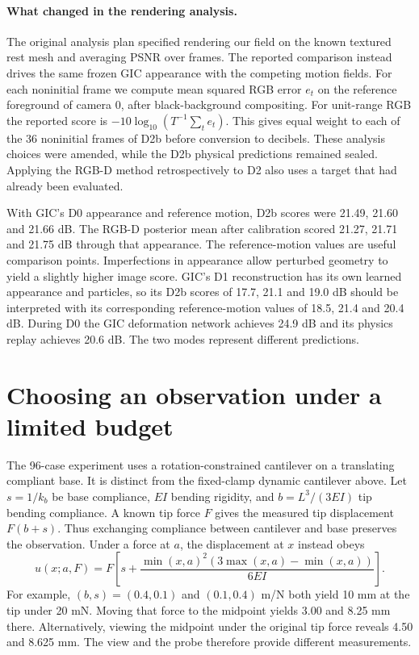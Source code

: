 \paragraph{What changed in the rendering analysis.}
The original analysis plan specified rendering our field on the known textured rest mesh and averaging PSNR over frames. The reported comparison instead drives the same frozen GIC appearance with the competing motion fields. For each noninitial frame we compute mean squared RGB error $e_t$ on the reference foreground of camera 0, after black-background compositing. For unit-range RGB the reported score is $-10\log_{10}(T^{-1}\sum_t e_t)$. This gives equal weight to each of the 36 noninitial frames of D2b before conversion to decibels. These analysis choices were amended, while the D2b physical predictions remained sealed. Applying the RGB-D method retrospectively to D2 also uses a target that had already been evaluated.

With GIC's D0 appearance and reference motion, D2b scores were 21.49, 21.60 and 21.66 dB. The RGB-D posterior mean after calibration scored 21.27, 21.71 and 21.75 dB through that appearance. The reference-motion values are useful comparison points. Imperfections in appearance allow perturbed geometry to yield a slightly higher image score. GIC's D1 reconstruction has its own learned appearance and particles, so its D2b scores of 17.7, 21.1 and 19.0 dB should be interpreted with its corresponding reference-motion values of 18.5, 21.4 and 20.4 dB. During D0 the GIC deformation network achieves 24.9 dB and its physics replay achieves 20.6 dB. The two modes represent different predictions.

\section{Choosing an observation under a limited budget}
\label{sec:supp-decision}
The 96-case experiment uses a rotation-constrained cantilever on a translating compliant base. It is distinct from the fixed-clamp dynamic cantilever above. Let $s=1/k_b$ be base compliance, $EI$ bending rigidity, and $b=L^3/(3EI)$ tip bending compliance. A known tip force $F$ gives the measured tip displacement $F(b+s)$. Thus exchanging compliance between cantilever and base preserves the observation. Under a force at $a$, the displacement at $x$ instead obeys
\begin{equation}
u(x;a,F)=F\!\left[s+\frac{\min(x,a)^2(3\max(x,a)-\min(x,a))}{6EI}\right].
\end{equation}
For example, $(b,s)=(0.4,0.1)$ and $(0.1,0.4)$ m/N both yield 10 mm at the tip under 20 mN. Moving that force to the midpoint yields 3.00 and 8.25 mm there. Alternatively, viewing the midpoint under the original tip force reveals 4.50 and 8.625 mm. The view and the probe therefore provide different measurements.

